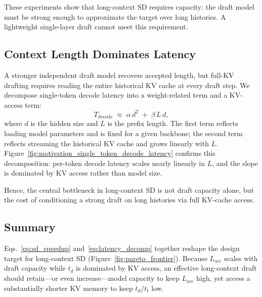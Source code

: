 These experiments show that long-context SD requires capacity: the draft model must be strong enough to approximate the target over long histories. A lightweight single-layer draft cannot meet this requirement.

\subsection{Context Length Dominates Latency}

A stronger independent draft model recovers accepted length, but full-KV drafting requires reading the entire historical KV cache at every draft step. We decompose single-token decode latency into a weight-related term and a KV-access term:
\begin{equation}
    T_{\text{decode}} \;\approx\; \alpha\,d^{2} \;+\; \beta\,L\,d,
    \label{eq:latency_decomp}
\end{equation}
where $d$ is the hidden size and $L$ is the prefix length. The first term reflects loading model parameters and is fixed for a given backbone; the second term reflects streaming the historical KV cache and grows linearly with $L$.
Figure~\ref{fig:motivation_single_token_decode_latency} confirms this decomposition: per-token decode latency scales nearly linearly in $L$, and the slope is dominated by KV access rather than model size.

Hence, the central bottleneck in long-context SD is not draft capacity alone, but the cost of conditioning a strong draft on long histories via full KV-cache access.

\subsection{Summary}

Eqs.~\ref{eq:sd_speedup} and~\ref{eq:latency_decomp} together reshape the design target for long-context SD (Figure~\ref{fig:pareto_frontier}).
Because $L_{\mathrm{acc}}$ scales with draft capacity while $t_d$ is dominated by KV access, an effective long-context draft should retain---or even increase---model capacity to keep $L_{\mathrm{acc}}$ high, yet access a substantially shorter KV memory to keep $t_d/t_t$ low.

